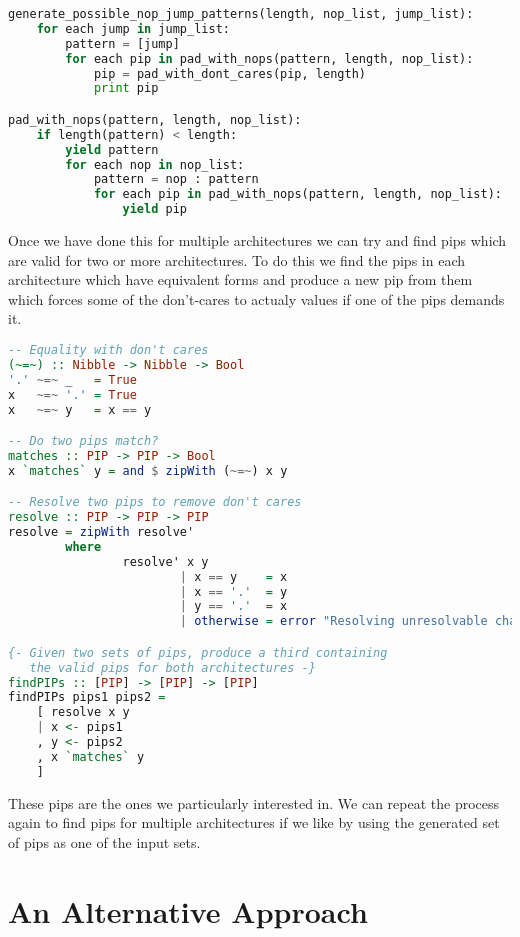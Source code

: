 \documentclass[]{book}
\begin{document}
\begin{lstlisting}[language=python]
generate_possible_nop_jump_patterns(length, nop_list, jump_list):
    for each jump in jump_list:
        pattern = [jump]
        for each pip in pad_with_nops(pattern, length, nop_list):
            pip = pad_with_dont_cares(pip, length)
            print pip

pad_with_nops(pattern, length, nop_list):
    if length(pattern) < length:
        yield pattern
        for each nop in nop_list:
            pattern = nop : pattern
            for each pip in pad_with_nops(pattern, length, nop_list):
                yield pip           
\end{lstlisting}
Once we have done this for multiple architectures we can try and find
pips which are valid for two or more architectures. To do this we find
the pips in each architecture which have equivalent forms and produce a
new pip from them which forces some of the don't-cares to actualy values
if one of the pips demands it.

\begin{lstlisting}[language=haskell]
-- Equality with don't cares
(~=~) :: Nibble -> Nibble -> Bool
'.' ~=~ _   = True
x   ~=~ '.' = True
x   ~=~ y   = x == y

-- Do two pips match?
matches :: PIP -> PIP -> Bool
x `matches` y = and $ zipWith (~=~) x y

-- Resolve two pips to remove don't cares
resolve :: PIP -> PIP -> PIP
resolve = zipWith resolve'
        where
                resolve' x y
                        | x == y    = x
                        | x == '.'  = y
                        | y == '.'  = x
                        | otherwise = error "Resolving unresolvable characters"

{- Given two sets of pips, produce a third containing 
   the valid pips for both architectures -}
findPIPs :: [PIP] -> [PIP] -> [PIP]
findPIPs pips1 pips2 = 
    [ resolve x y
    | x <- pips1                            
    , y <- pips2                                      
    , x `matches` y
    ]
\end{lstlisting}
These pips are the ones we particularly interested in. We can repeat the
process again to find pips for multiple architectures if we like by
using the generated set of pips as one of the input sets.

\section{An Alternative Approach}
\end{document}
